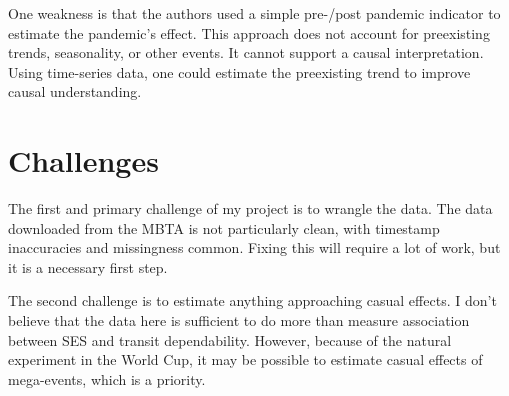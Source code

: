 \documentclass[12pt]{article}
\begin{document}
One weakness is that the authors used a simple pre-/post pandemic indicator to estimate the pandemic's effect.
This approach does not account for preexisting trends, seasonality, or other events.
It cannot support a causal interpretation.
Using time-series data, one could estimate the preexisting trend to improve causal understanding. 

\section{Challenges}
The first and primary challenge of my project is to wrangle the data.
The data downloaded from the MBTA is not particularly clean, with timestamp inaccuracies and missingness common.
Fixing this will require a lot of work, but it is a necessary first step.

The second challenge is to estimate anything approaching casual effects.
I don't believe that the data here is sufficient to do more than measure association between SES and transit dependability.
However, because of the natural experiment in the World Cup, it may be possible to estimate casual effects of mega-events, which is a priority.
\end{document}
